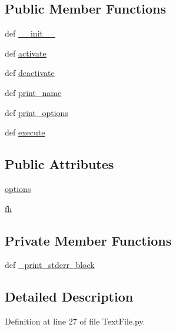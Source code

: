 \subsection*{Public Member Functions}
\begin{DoxyCompactItemize}
\item 
def \hyperlink{class_text_file_1_1_text_file_a4d16471d6ce37fa2acd4af48f2385e0e}{\-\_\-\-\_\-init\-\_\-\-\_\-}
\item 
def \hyperlink{class_text_file_1_1_text_file_a2b862cfd19468709d9d335d7ef293528}{activate}
\item 
def \hyperlink{class_text_file_1_1_text_file_acfed4dc43a31a56a9766b1a203d79f80}{deactivate}
\item 
def \hyperlink{class_text_file_1_1_text_file_a690d7772cd59f2deb2d9fa1f9fdeebb9}{print\-\_\-name}
\item 
def \hyperlink{class_text_file_1_1_text_file_a338c1c18fda72e0175f63c27dbdd188f}{print\-\_\-options}
\item 
def \hyperlink{class_text_file_1_1_text_file_a2b2f16806b79d9e24c6ef4bde70d3e7b}{execute}
\end{DoxyCompactItemize}
\subsection*{Public Attributes}
\begin{DoxyCompactItemize}
\item 
\hyperlink{class_text_file_1_1_text_file_a064e68c6dc686f22e4d83dee541c2c0d}{options}
\item 
\hyperlink{class_text_file_1_1_text_file_a5cb58695c398aff9e9780fd33f415c05}{fh}
\end{DoxyCompactItemize}
\subsection*{Private Member Functions}
\begin{DoxyCompactItemize}
\item 
def \hyperlink{class_text_file_1_1_text_file_a65fbc2c1710744e3ebd1038d404af139}{\-\_\-print\-\_\-stderr\-\_\-block}
\end{DoxyCompactItemize}


\subsection{Detailed Description}


Definition at line 27 of file Text\-File.\-py.



